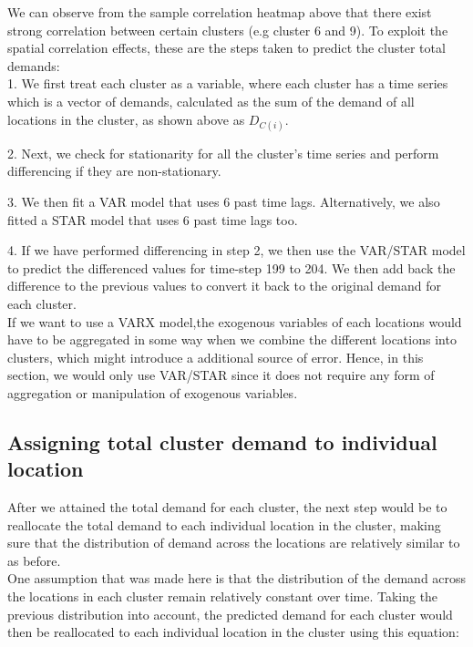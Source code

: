\documentclass[nonblindrev,msom]{informs3} %
\begin{document}
\noindent We can observe from the sample correlation heatmap above that there exist strong correlation between certain clusters (e.g cluster 6 and 9). To exploit the spatial correlation effects, these are the steps taken to predict the cluster total demands: \\

1. We first treat each cluster as a variable, where each cluster has a time series which is a vector of demands, calculated as the sum of the demand of all locations in the cluster, as shown above as $D_{C(i)}$. 

2. Next, we check for stationarity for all the cluster's time series and perform differencing if they are non-stationary. 

3. We then fit a VAR model that uses 6 past time lags. Alternatively, we also fitted a STAR model that uses 6 past time lags too. 

4. If we have performed differencing in step 2, we then use the VAR/STAR model to predict the differenced values for time-step 199 to 204. We then add back the difference to the previous values to convert it back to the original demand for each cluster. \\

\noindent If we want to use a VARX model,the exogenous variables of each locations would have to be aggregated in some way when we combine the different locations into clusters, which might introduce a additional source of error. Hence, in this section, we would only use VAR/STAR since it does not require any form of aggregation or manipulation of exogenous variables.


\subsection{Assigning total cluster demand to individual location}

After we attained the total demand for each cluster, the next step would be to reallocate the total demand to each individual location in the cluster, making sure that the distribution of demand across the locations are relatively similar to as before. \\

\noindent One assumption that was made here is that the distribution of the demand across the locations in each cluster remain relatively constant over time. Taking the previous distribution into account, the predicted demand for each cluster would then be reallocated to each individual location in the cluster using this equation: \\
\end{document}
